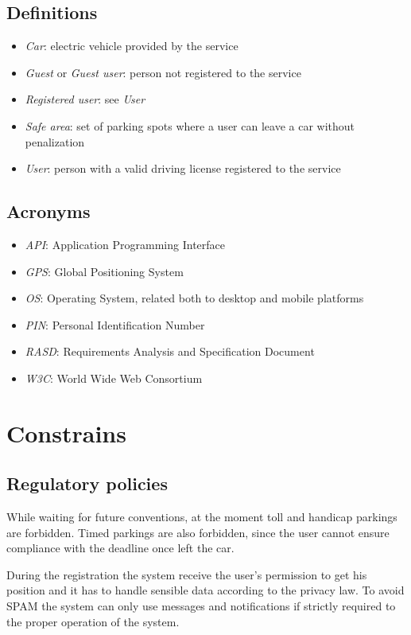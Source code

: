 \subsection{Definitions}
\begin{itemize}
	\item \emph{Car}: electric vehicle provided by the service
	\item \emph{Guest} or \emph{Guest user}: person not registered to the service
	\item \emph{Registered user}: see \emph{User}
	\item \emph{Safe area}: set of parking spots where a user can leave a car without penalization 
	\item \emph{User}: person with a valid driving license registered to the service
\end{itemize}

\subsection{Acronyms}
\begin{itemize}
	\item \emph{API}: Application Programming Interface
	\item \emph{GPS}: Global Positioning System
	\item \emph{OS}: Operating System, related both to desktop and mobile platforms
	\item \emph{PIN}: Personal Identification Number
	\item \emph{RASD}: Requirements Analysis and Specification Document
	\item \emph{W3C}: World Wide Web Consortium
\end{itemize}

\section{Constrains}

\subsection{Regulatory policies}
While waiting for future conventions, at the moment toll and handicap parkings are forbidden. Timed parkings are also forbidden, since the user cannot ensure compliance with the deadline once left the car.

During the registration the system receive the user's permission to get his position and it has to handle sensible data according to the privacy law. To avoid SPAM the system can only use messages and notifications if strictly required to the proper operation of the system.

